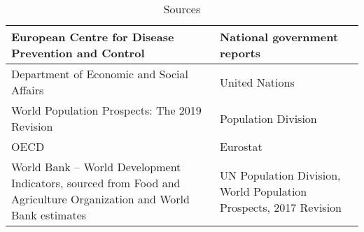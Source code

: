 \documentclass[10pt]{article}
\begin{document}

\begin{table}[htbp]
    \centering
    \begin{tabular}{|p{6cm}|p{6cm}|}
        \hline
        European Centre for Disease Prevention and Control &  National government reports \\
        \hline 
        Department of Economic and Social Affairs & United Nations \\
        \hline
        World Population Prospects: The 2019 Revision & Population Division \\
        \hline 
        OECD & Eurostat \\
        \hline
        World Bank – World Development Indicators, sourced from Food and Agriculture Organization and World Bank estimates &  UN Population Division, World Population Prospects, 2017 Revision\\
        \hline
    \end{tabular}
	\caption{Sources}
	\label{tab:data_sources}
\end{table}
\end{document}
